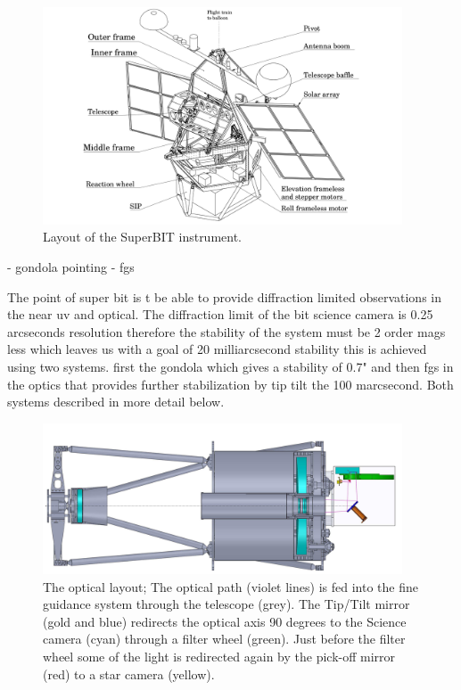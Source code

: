 \begin{figure}
    \begin{small}
        \begin{center}
            \includegraphics[width=0.95\textwidth]{Introduction/figs/bit_model.png}
        \end{center}
        \caption{Layout of the SuperBIT instrument.}
        \label{fig:bit}
    \end{small}
\end{figure}


- gondola pointing 
- fgs

The point of super bit is t be able to provide diffraction limited observations in the near uv and optical. The diffraction limit of the bit science camera is 0.25 arcseconds resolution therefore the stability of the system must be 2 order mags less which leaves us with a goal of 20 milliarcsecond stability this is achieved using two systems. first the gondola which gives a stability of 0.7" and then fgs in the optics that provides further stabilization by tip tilt the 100 marcsecond. Both systems described in more detail below.

\begin{figure}
    \begin{small}
        \begin{center}
            \includegraphics[width=0.95\textwidth]{Introduction/figs/optical_path.png}
        \end{center}
        \caption{The optical layout; The optical path (violet lines) is fed into the fine guidance system through the telescope (grey). The Tip/Tilt mirror (gold and blue) redirects the optical axis 90 degrees to the Science camera (cyan) through a filter wheel (green). Just before the filter wheel some of the light is redirected again by the pick-off mirror (red) to a star camera (yellow).}
        \label{fig:optics}
    \end{small}
\end{figure}

